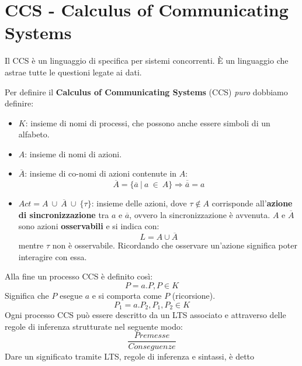 \section{CCS - Calculus of Communicating Systems}
Il CCS è un linguaggio di specifica per sistemi concorrenti. È un linguaggio che
astrae tutte le questioni legate ai dati.
\begin{definizione}
    Per definire il \textbf{Calculus of Communicating Systems} (CCS) \textit{puro}
    dobbiamo definire:
    \begin{itemize}
        \item  $K$: insieme di nomi di processi, che possono anche essere
              simboli di un alfabeto.
        \item  $A$: insieme di nomi di azioni.
        \item $\overline{A}$: insieme di co-nomi di azioni contenute
              in $A$:
              \begin{equation}
                  \overline{A} = \{\overline{a} \ | \ a \ \in \ A\} \Rightarrow
                  \overline{\overline{a}} = a
              \end{equation}
        \item $Act = A \ \cup  \ \overline{A} \ \cup \ \{\tau\}$: insieme delle
              azioni, dove $\tau \notin A$ corrisponde all'\textbf{azione di
                  sincronizzazione} tra $a$ e $\overline{a}$, ovvero la
              sincronizzazione è avvenuta. $A$ e $\overline{A}$ sono azioni
              \textbf{osservabili} e si indica con: $$L = A \cup \overline{A}$$
              mentre $\tau$ non è osservabile. Ricordando che osservare un'azione
              significa poter interagire con essa.
    \end{itemize}
\end{definizione}
Alla fine un processo CCS è definito così:
\begin{equation}
    P = a.P, P \in K
\end{equation}
Significa che $P$ esegue $a$ e si comporta come $P$ (ricorsione).
\begin{equation}
    P_1 = a.P_2, P_1, P_2 \in K
\end{equation}
Ogni processo CCS può essere descritto da un LTS associato e attraverso delle
regole di inferenza strutturate nel seguente modo:
\begin{equation}
    \frac{Premesse}{Conseguenze}
\end{equation}
Dare un significato tramite LTS, regole di inferenza e sintassi, è detto
